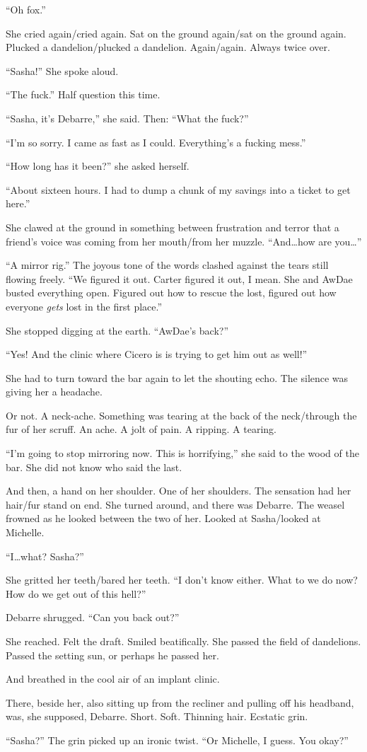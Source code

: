 ``Oh fox.''

She cried again/cried again. Sat on the ground again/sat on the ground again. Plucked a dandelion/plucked a dandelion. Again/again. Always twice over.

``Sasha!'' She spoke aloud.

``The fuck.'' Half question this time.

``Sasha, it's Debarre,'' she said. Then: ``What the fuck?''

``I'm so sorry. I came as fast as I could. Everything's a fucking mess.''

``How long has it been?'' she asked herself.

``About sixteen hours. I had to dump a chunk of my savings into a ticket to get here.''

She clawed at the ground in something between frustration and terror that a friend's voice was coming from her mouth/from her muzzle. ``And\ldots{}how are you\ldots{}''

``A mirror rig.'' The joyous tone of the words clashed against the tears still flowing freely. ``We figured it out. Carter figured it out, I mean. She and AwDae busted everything open. Figured out how to rescue the lost, figured out how everyone \emph{gets} lost in the first place.''

She stopped digging at the earth. ``AwDae's back?''

``Yes! And the clinic where Cicero is is trying to get him out as well!''

She had to turn toward the bar again to let the shouting echo. The silence was giving her a headache.

Or not. A neck-ache. Something was tearing at the back of the neck/through the fur of her scruff. An ache. A jolt of pain. A ripping. A tearing.

``I'm going to stop mirroring now. This is horrifying,'' she said to the wood of the bar. She did not know who said the last.

And then, a hand on her shoulder. One of her shoulders. The sensation had her hair/fur stand on end. She turned around, and there was Debarre. The weasel frowned as he looked between the two of her. Looked at Sasha/looked at Michelle.

``I\ldots{}what? Sasha?''

She gritted her teeth/bared her teeth. ``I don't know either. What to we do now? How do we get out of this hell?''

Debarre shrugged. ``Can you back out?''

She reached. Felt the draft. Smiled beatifically. She passed the field of dandelions. Passed the setting sun, or perhaps he passed her.

And breathed in the cool air of an implant clinic.

There, beside her, also sitting up from the recliner and pulling off his headband, was, she supposed, Debarre. Short. Soft. Thinning hair. Ecstatic grin.

``Sasha?'' The grin picked up an ironic twist. ``Or Michelle, I guess. You okay?''
